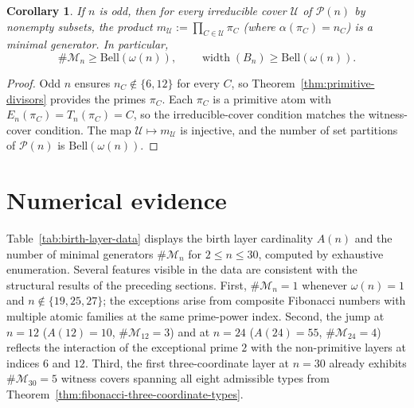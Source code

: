 \documentclass[11pt,letterpaper]{article}
\numberwithin{equation}{section}
\theoremstyle{plain}
\newtheorem{corollary}[theorem]{Corollary}
\theoremstyle{definition}
\theoremstyle{remark}
\DeclareMathOperator{\widthop}{width}
\begin{document}
\begin{corollary}\label{cor:odd-primitive-cover-realization}
If $n$ is odd, then for every irreducible cover $\mathcal U$ of
$\mathcal P(n)$ by nonempty subsets, the product
$m_{\mathcal U}:=\prod_{C\in\mathcal U}\pi_C$ (where $\alpha(\pi_C)=n_C$) is
a minimal generator. In particular,
\[
\#\mathcal M_n\ge\mathrm{Bell}(\omega(n)),
\qquad
\widthop(B_n)\ge\mathrm{Bell}(\omega(n)).
\]
\end{corollary}

\begin{proof}
Odd $n$ ensures $n_C\notin\{6,12\}$ for every $C$, so
Theorem~\ref{thm:primitive-divisors} provides the primes $\pi_C$. Each
$\pi_C$ is a primitive atom with $E_n(\pi_C)=T_n(\pi_C)=C$, so the
irreducible-cover condition matches the witness-cover condition. The map
$\mathcal U\mapsto m_{\mathcal U}$ is injective, and the number of set
partitions of $\mathcal P(n)$ is $\mathrm{Bell}(\omega(n))$.
\end{proof}

\section{Numerical evidence}\label{sec:numerical}

Table~\ref{tab:birth-layer-data} displays the birth layer cardinality $A(n)$
and the number of minimal generators $\#\mathcal M_n$ for $2\le n\le 30$,
computed by exhaustive enumeration. Several features visible in the data are
consistent with the structural results of the preceding sections.
First, $\#\mathcal M_n=1$ whenever $\omega(n)=1$ and
$n\notin\{19,25,27\}$; the exceptions arise from composite Fibonacci numbers
with multiple atomic families at the same prime-power index.
Second, the jump at $n=12$ ($A(12)=10$, $\#\mathcal M_{12}=3$) and at $n=24$
($A(24)=55$, $\#\mathcal M_{24}=4$) reflects the interaction of the
exceptional prime $2$ with the non-primitive layers at indices $6$ and $12$.
Third, the first three-coordinate layer at $n=30$ already exhibits
$\#\mathcal M_{30}=5$ witness covers spanning all eight admissible types from
Theorem~\ref{thm:fibonacci-three-coordinate-types}.
\end{document}
